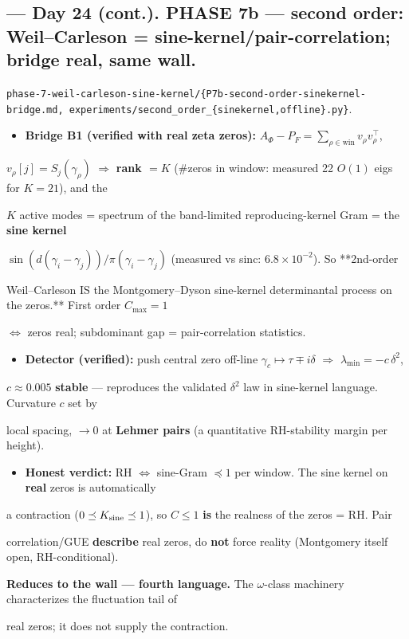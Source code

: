 \documentclass[10pt]{article}
\begin{document}
\subsection*{ --- Day 24 (cont.). PHASE 7b --- second order: Weil--Carleson = sine-kernel/pair-correlation; bridge real, same wall.}
\texttt{phase-7-weil-carleson-sine-kernel/\{P7b-second-order-sinekernel-bridge.md, experiments/second\_order\_\{sinekernel,offline\}.py\}}.\par
\begin{itemize}
\item \textbf{Bridge B1 (verified with real zeta zeros):} $A_\Phi-P_F=\sum_{\rho\in\text{win}}v_\rho v_\rho^\top$,
\end{itemize}
  $v_\rho[j]=S_j(\gamma_\rho)$ \ensuremath{\Rightarrow} \textbf{rank $=K$} (\#zeros in window: measured 22 $O(1)$ eigs for $K{=}21$), and the\par
  $K$ active modes = spectrum of the band-limited reproducing-kernel Gram = the \textbf{sine kernel}\par
  $\sin(d(\gamma_i-\gamma_j))/\pi(\gamma_i-\gamma_j)$ (measured vs sinc: $6.8\times10^{-2}$). So **2nd-order\par
  Weil--Carleson IS the Montgomery--Dyson sine-kernel determinantal process on the zeros.** First order $C_{\max}{=}1$\par
  $\iff$ zeros real; subdominant gap = pair-correlation statistics.\par
\begin{itemize}
\item \textbf{Detector (verified):} push central zero off-line $\gamma_c\mapsto\tau\mp i\delta$ \ensuremath{\Rightarrow} $\lambda_{\min}=-c\,\delta^2$,
\end{itemize}
  $c\approx0.005$ \textbf{stable} --- reproduces the validated $\delta^2$ law in sine-kernel language. Curvature $c$ set by\par
  local spacing, $\to0$ at \textbf{Lehmer pairs} (a quantitative RH-stability margin per height).\par
\begin{itemize}
\item \textbf{Honest verdict:} RH $\iff$ sine-Gram $\preceq1$ per window. The sine kernel on \textbf{real} zeros is automatically
\end{itemize}
  a contraction ($0\preceq K_{\rm sine}\preceq1$), so $C\le1$ \textbf{is} the realness of the zeros = RH. Pair\par
  correlation/GUE \textbf{describe} real zeros, do \textbf{not} force reality (Montgomery itself open, RH-conditional).\par
  \textbf{Reduces to the wall --- fourth language.} The $\omega$-class machinery characterizes the fluctuation tail of\par
  real zeros; it does not supply the contraction.\par
\end{document}

